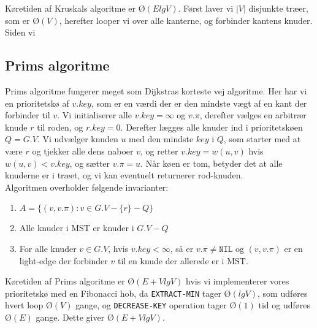 Køretiden af Kruskals algoritme er $Ø(ElgV)$. Først laver vi $|V|$ disjunkte træer, som er $Ø(V)$, herefter looper vi over alle kanterne, og forbinder kantens knuder. Siden vi 


\subsection{Prims algoritme}
Prims algoritme fungerer meget som Dijkstras korteste vej algoritme. Her har vi en prioritetskø af $v.key$, som er en værdi der er den mindste vægt af en kant der forbinder til $v$. Vi initialiserer alle $v.key = \infty$ og $v.\pi$, derefter vælges en arbitrær knude $r$ til roden, og $r.key = 0$. Derefter lægges alle knuder ind i prioritetskøen $Q = G.V$. Vi udvælger knuden $u$ med den mindste $key$ i $Q$, som starter med at være $r$ og tjekker alle dens naboer $v$, og retter $v.key = w(u,v)$ hvis $w(u,v) < v.key$, og sætter $v.\pi = u$. Når køen er tom, betyder det at alle knuderne er i træet, og vi kan eventuelt returnerer rod-knuden.\\

Algoritmen overholder følgende invarianter:
\begin{enumerate}
\item $A = \{(v,v.\pi) : v \in G.V - \{r\} - Q\}$
\item Alle knuder i MST er knuder i $G.V - Q$
\item For alle knuder $v \in G.V$, hvis $v.key < \infty$, så er $v.\pi \neq \texttt{NIL}$ og $(v, v.\pi)$ er en light-edge der forbinder $v$ til en knude der allerede er i MST.
\end{enumerate}

Køretiden af Prims algoritme er $Ø(E+VlgV)$ hvis vi implementerer vores prioritetskø med en Fibonacci hob, da \texttt{EXTRACT-MIN} tager $Ø(lgV)$, som udføres hvert loop $Ø(V)$ gange, og \texttt{DECREASE-KEY} operation tager $Ø(1)$ tid og udføres $Ø(E)$ gange. Dette giver $Ø(E+VlgV)$. 

